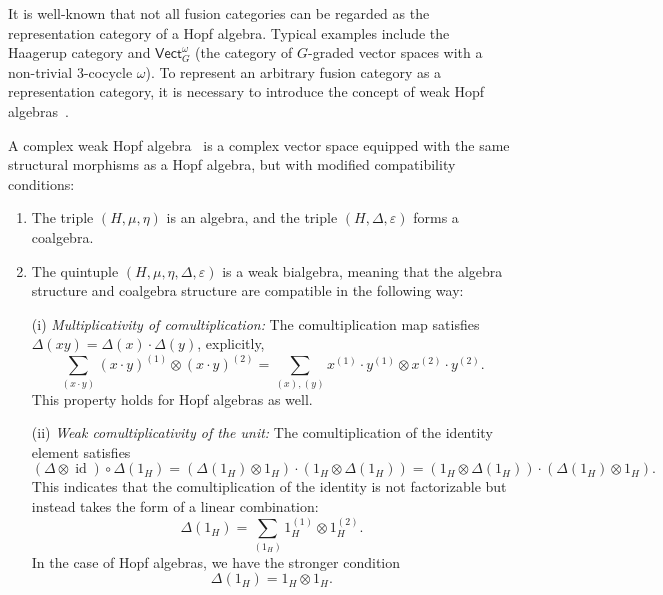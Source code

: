 \documentclass[a4paper,11pt]{article}
\theoremstyle{theorem}
\theoremstyle{remark}
\newcommand{\cone}{(1)}
\newcommand{\ctwo}{(2)}
\newcommand{\id}{\operatorname{id}}
\newcommand{\Vect}{\mathsf{Vect}}
\begin{document}
It is well-known that not all fusion categories can be regarded as the representation category of a Hopf algebra. Typical examples include the Haagerup category and \(\Vect_G^{\omega}\) (the category of \(G\)-graded vector spaces with a non-trivial 3-cocycle \(\omega\)). To represent an arbitrary fusion category as a representation category, it is necessary to introduce the concept of weak Hopf algebras~\cite{szlachanyi2000finite,ostrik2003module,etingof2005fusion}.


A complex weak Hopf algebra~\cite{BOHM1998weak} is a complex vector space equipped with the same structural morphisms as a Hopf algebra, but with modified compatibility conditions:

\begin{enumerate}

\item The triple \((H,\mu,\eta)\) is an algebra,  and the triple $(H,\Delta,\varepsilon)$ forms a coalgebra.

\item The quintuple $(H, \mu, \eta, \Delta, \varepsilon)$ is a weak bialgebra, meaning that the algebra structure and coalgebra structure are compatible in the following way:

(i) \emph{Multiplicativity of comultiplication:} The comultiplication map satisfies \(\Delta(xy) = \Delta(x) \cdot \Delta(y)\), explicitly,  
\begin{equation}
\sum_{(x \cdot y)} (x \cdot y)^{\cone} \otimes (x \cdot y)^{\ctwo} = \sum_{(x), (y)} x^{\cone} \cdot y^{\cone} \otimes x^{\ctwo} \cdot y^{\ctwo}.  
\end{equation}
This property holds for Hopf algebras as well.



(ii) \emph{Weak comultiplicativity of the unit:} The comultiplication of the identity element satisfies  
\begin{equation}
(\Delta \otimes \id) \circ \Delta(1_H) = (\Delta(1_H) \otimes 1_H) \cdot (1_H \otimes \Delta(1_H)) = (1_H \otimes \Delta(1_H)) \cdot (\Delta(1_H) \otimes 1_H).
\end{equation}  
This indicates that the comultiplication of the identity is not factorizable but instead takes the form of a linear combination:  
\begin{equation}
\Delta(1_H) = \sum_{(1_H)} 1_H^{\cone} \otimes 1_H^{\ctwo}.
\end{equation}  
In the case of Hopf algebras, we have the stronger condition  
\begin{equation}
\Delta(1_H) = 1_H \otimes 1_H.
\end{equation}



\end{enumerate}
\end{document}
